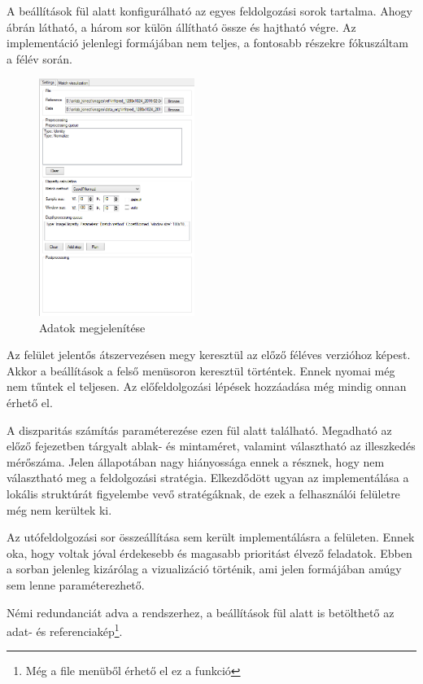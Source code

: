 A beállítások fül alatt konfigurálható az egyes feldolgozási sorok tartalma.
Ahogy  ábrán látható, a három sor külön állítható össze és hajtható végre.
Az implementáció jelenlegi formájában nem teljes, a fontosabb részekre fókuszáltam a félév során.

\begin{figure}
	\centering
	\includegraphics[width=0.45\textwidth]{figures/gui_settings.png}
	\caption{Adatok megjelenítése}
	\label{fig:guiSettings}
\end{figure}

Az felület jelentős átszervezésen megy keresztül az előző féléves verzióhoz képest.
Akkor a beállítások a felső menüsoron keresztül történtek.
Ennek nyomai még nem tűntek el teljesen.
Az előfeldolgozási lépések hozzáadása még mindig onnan érhető el.

A diszparitás számítás paraméterezése ezen fül alatt található.
Megadható az előző fejezetben tárgyalt ablak- és mintaméret, valamint választható az illeszkedés mérőszáma.
Jelen állapotában nagy hiányossága ennek a résznek, hogy nem választható meg a feldolgozási stratégia.
Elkezdődött ugyan az implementálása a lokális struktúrát figyelembe vevő stratégáknak, de ezek a felhasználói felületre még nem kerültek ki.

Az utófeldolgozási sor összeállítása sem került implementálásra a felületen.
Ennek oka, hogy voltak jóval érdekesebb és magasabb prioritást élvező feladatok.
Ebben a sorban jelenleg kizárólag a vizualizáció történik, ami jelen formájában amúgy sem lenne paraméterezhető.

Némi redundanciát adva a rendszerhez, a beállítások fül alatt is betölthető az adat- és referenciakép\footnote{Még a file menüből érhető el ez a funkció}.

